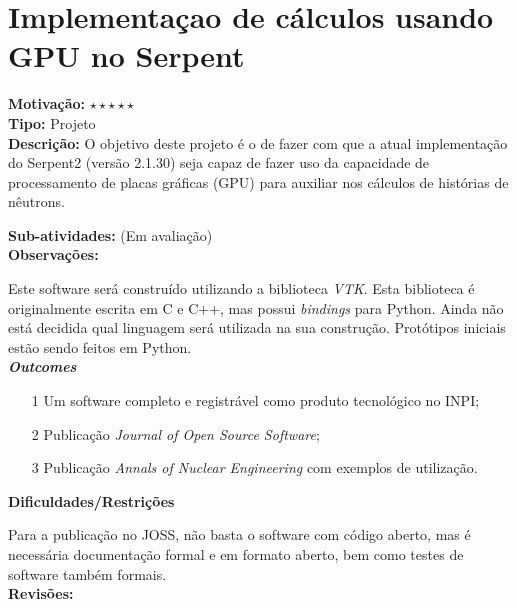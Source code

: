 \chapter{Implementaçao de cálculos usando GPU no Serpent}

\textbf{Motivação:} $\star\star\star\star\star$\\

\textbf{Tipo:} Projeto\\

\textbf{Descrição:} O objetivo deste projeto é o de fazer com que a atual 
implementação do Serpent2 (versão 2.1.30) seja capaz de fazer uso da capacidade de 
processamento de placas gráficas (GPU) para auxiliar nos cálculos de histórias de 
nêutrons.

\textbf{Sub-atividades:} (Em avaliação) \\


\textbf{Observações:}

Este software será construído utilizando a biblioteca \textit{VTK}. Esta biblioteca 
é originalmente escrita em C e C++, mas possui \textit{bindings} para Python. Ainda não está decidida qual linguagem será utilizada na sua construção. Protótipos 
iniciais estão sendo feitos em Python.\\

\textbf{\textit{Outcomes}}

\begin{itemize}
	\item[1] Um software completo e registrável como produto tecnológico no 
INPI;
	\item[2] Publicação \textit{Journal of Open Source Software};
	\item[3] Publicação \textit{Annals of Nuclear Engineering} com exemplos de 
	utilização.
\end{itemize}

\textbf{Dificuldades/Restrições}

Para a publicação no JOSS, não basta o software com código aberto, mas é necessária 
documentação formal e em formato aberto, bem como testes de software também formais.\\

\textbf{Revisões:}
\date{21/11/2018}
